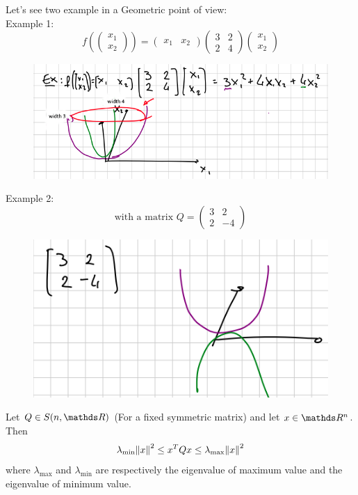 \documentclass[computationalMathematics.tex]{subfiles}
\begin{document}
Let's see two example in a Geometric point of view:\\
Example 1:
\[
   f(\begin{pmatrix} x_1\\ x_2 \end{pmatrix}) = \begin{pmatrix} x_1 & x_2 \end{pmatrix}
\begin{pmatrix} 3 & 2 \\ 2 & 4 \end{pmatrix}\begin{pmatrix} x_1\\ x_2 \end{pmatrix}
\]
\begin{figure}[H]
    \centering
    \includegraphics[scale = 0.45]{pics/26sett/quadratic_form_1.png}
\end{figure}

Example 2: 
\[
  \text{with a matrix } Q = \begin{pmatrix} 3 & 2 \\ 2 & -4 \end{pmatrix}
  \]
\begin{figure}[H]
    \centering
    \includegraphics[scale = 0.45]{pics/26sett/quadratic_form_2.png}
\end{figure}

\newpage
\begin{proposition}
  Let $Q \in S(n, \R)$ (For a fixed symmetric matrix) and let $x \in \R^n$. Then 
  \[
    \lambda_{\text{min}} {\left\lVert x\right\rVert}^2 \le {x}^{T}Qx \le \lambda_{\text{max}} {\left\lVert x\right\rVert}^2
  \]
  where $\lambda_{\text{max}}$ and $\lambda_{\text{min}}$ are respectively the eigenvalue of maximum value and the eigenvalue of minimum value.
\end{proposition}
\end{document}
